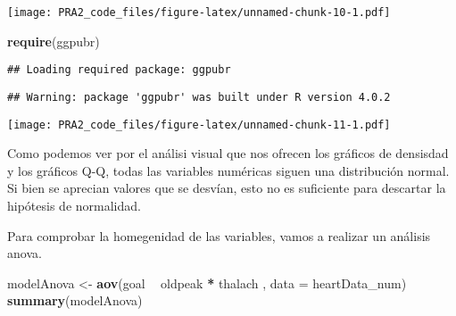 \documentclass[
]{article}
\newenvironment{Shaded}{\begin{snugshade}}{\end{snugshade}}
\newcommand{\DataTypeTok}[1]{\textcolor[rgb]{0.13,0.29,0.53}{#1}}
\newcommand{\KeywordTok}[1]{\textcolor[rgb]{0.13,0.29,0.53}{\textbf{#1}}}
\newcommand{\NormalTok}[1]{#1}
\newcommand{\OperatorTok}[1]{\textcolor[rgb]{0.81,0.36,0.00}{\textbf{#1}}}
\newcommand{\StringTok}[1]{\textcolor[rgb]{0.31,0.60,0.02}{#1}}
\begin{document}
\texttt{[image: PRA2\_code\_files/figure-latex/unnamed-chunk-10-1.pdf]}

\begin{Shaded}
\begin{Highlighting}[]
\KeywordTok{require}\NormalTok{(ggpubr)}
\end{Highlighting}
\end{Shaded}

\begin{verbatim}
## Loading required package: ggpubr
\end{verbatim}

\begin{verbatim}
## Warning: package 'ggpubr' was built under R version 4.0.2
\end{verbatim}

\begin{Shaded}
\end{Shaded}

\texttt{[image: PRA2\_code\_files/figure-latex/unnamed-chunk-11-1.pdf]}

Como podemos ver por el análisi visual que nos ofrecen los gráficos de
densisdad y los gráficos Q-Q, todas las variables numéricas siguen una
distribución normal. Si bien se aprecian valores que se desvían, esto no
es suficiente para descartar la hipótesis de normalidad.

Para comprobar la homegenidad de las variables, vamos a realizar un
análisis anova.

\begin{Shaded}
\begin{Highlighting}[]
\NormalTok{modelAnova <-}\StringTok{ }\KeywordTok{aov}\NormalTok{(goal }\OperatorTok{~}\StringTok{ }\NormalTok{oldpeak }\OperatorTok{*}\StringTok{ }\NormalTok{thalach , }\DataTypeTok{data =}\NormalTok{ heartData_num)}
\KeywordTok{summary}\NormalTok{(modelAnova)}
\end{Highlighting}
\end{Shaded}
\end{document}
